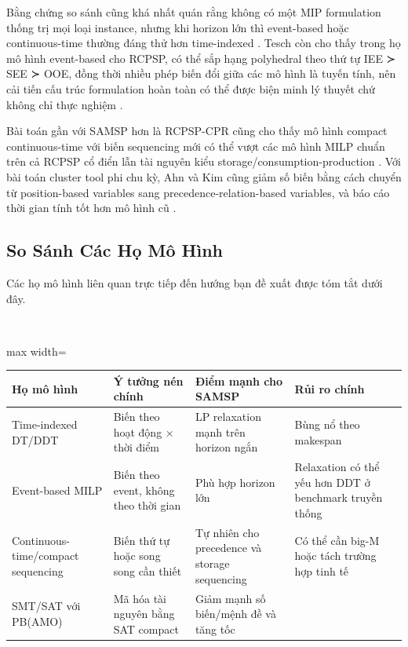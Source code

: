 Bằng chứng so sánh cũng khá nhất quán rằng không có một MIP formulation thống trị mọi loại instance, nhưng khi horizon lớn thì event-based hoặc continuous-time thường đáng thử hơn time-indexed  \cite{Koné2009Event-based}. Tesch còn cho thấy trong họ mô hình event-based cho RCPSP, có thể sắp hạng polyhedral theo thứ tự IEE ≻ SEE ≻ OOE, đồng thời nhiều phép biến đổi giữa các mô hình là tuyến tính, nên cải tiến cấu trúc formulation hoàn toàn có thể được biện minh lý thuyết chứ không chỉ thực nghiệm  \cite{Tesch2020A}.


Bài toán gần với SAMSP hơn là RCPSP-CPR cũng cho thấy mô hình compact continuous-time với biến sequencing mới có thể vượt các mô hình MILP chuẩn trên cả RCPSP cổ điển lẫn tài nguyên kiểu storage/consumption-production  \cite{Klein2024Mixed-integer}. Với bài toán cluster tool phi chu kỳ, Ahn và Kim cũng giảm số biến bằng cách chuyển từ position-based variables sang precedence-relation-based variables, và báo cáo thời gian tính tốt hơn mô hình cũ  \cite{Ahn2025A}.


\subsection*{So Sánh Các Họ Mô Hình}


Các họ mô hình liên quan trực tiếp đến hướng bạn đề xuất được tóm tắt dưới đây.


\mbox{}\\
\begin{adjustbox}{max width=\textwidth}
\begin{tabular}{p{4.0cm} | p{4.0cm} | p{4.0cm} | p{4.0cm}}
\hline
Họ mô hình & Ý tưởng nén chính & Điểm mạnh cho SAMSP & Rủi ro chính \\
\hline
Time-indexed DT/DDT & Biến theo hoạt động × thời điểm & LP relaxation mạnh trên horizon ngắn  \cite{Koné2009Event-based} & Bùng nổ theo makespan  \cite{Koné2009Event-based} \\
Event-based MILP & Biến theo event, không theo thời gian & Phù hợp horizon lớn  \cite{Koné2009Event-based} & Relaxation có thể yếu hơn DDT ở benchmark truyền thống  \cite{Koné2009Event-based} \\
Continuous-time/compact sequencing & Biến thứ tự hoặc song song cần thiết & Tự nhiên cho precedence và storage sequencing  \cite{Klein2024Mixed-integer} & Có thể cần big-M hoặc tách trường hợp tinh tế  \cite{Koné2009Event-based} \cite{Sayah2023Continuous-Time} \\
SMT/SAT với PB(AMO) & Mã hóa tài nguyên bằng SAT compact & Giảm mạnh số biến/mệnh đề và tăng tốc  \cite{Bofill2020SMT} \cite{Bofill2021SAT} \\
\hline
\end{tabular}
\end{adjustbox}


